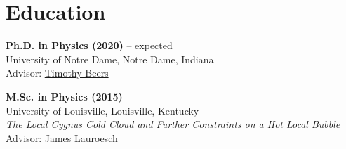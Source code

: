 
\section*{Education}





\noindent
\textbf{Ph.D. in Physics (2020)} -- expected\\
University of Notre Dame, Notre Dame, Indiana\\
Advisor: \href{http://physics.nd.edu/people/faculty/timothy-c-beers/}{Timothy Beers}

\bigskip


\noindent
\textbf{M.Sc. in Physics (2015)}\\
University of Louisville, Louisville, Kentucky\\
\textit{\href{http://github.com/glentner/MastersThesis}
	{The Local Cygnus Cold Cloud and Further Constraints on a Hot Local Bubble}}\\
Advisor: \href{http://www.physics.louisville.edu/jtl/}{James Lauroesch}
